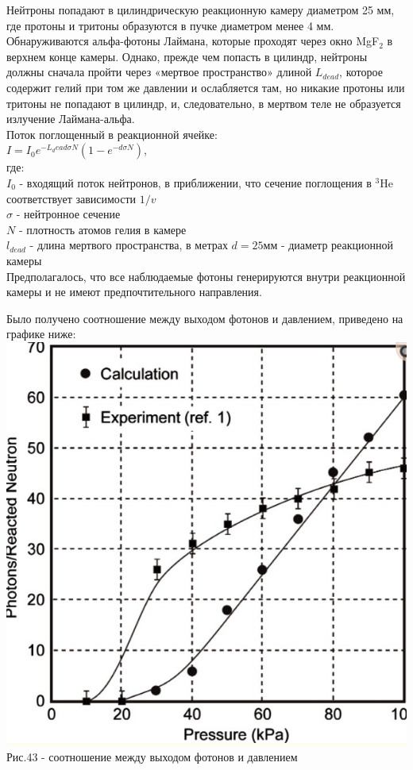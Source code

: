 \documentclass[11pt]{report}
\begin{document}
Нейтроны попадают в цилиндрическую реакционную камеру диаметром 25 мм, где протоны и тритоны образуются в пучке диаметром менее 4 мм. Обнаруживаются альфа-фотоны Лаймана, которые проходят через окно MgF$_2$ в верхнем конце камеры. Однако, прежде чем попасть в цилиндр, нейтроны должны сначала пройти через «мертвое пространство» длиной $L_{dead}$, которое содержит гелий при том же давлении и ослабляется там, но никакие протоны или тритоны не попадают в цилиндр, и, следовательно, в мертвом теле не образуется излучение Лаймана-альфа. \\

Поток поглощенный в реакционной ячейке: \\

$I=I_0e^{-L_dead \sigma N}(1-e^{-d\sigma N})$, \\

где:\\
$I_0$ - входящий поток нейтронов, в приближении, что сечение поглощения в $^3 $He соответствует зависимости $1/v$\\
$\sigma$ - нейтронное сечение\\
$N$ - плотность атомов гелия в камере\\
$l_{dead} $ - длина мертвого пространства, в метрах
$d = 25$мм - диаметр реакционной камеры\\

Предполагалось, что все наблюдаемые фотоны генерируются внутри реакционной камеры и не имеют предпочтительного направления. 

Было получено соотношение между выходом фотонов и давлением, приведено на графике ниже:\\

\includegraphics[scale=0.5]{lyman_p}\\
Рис.43 - соотношение между выходом фотонов и давлением \\
\end{document}
